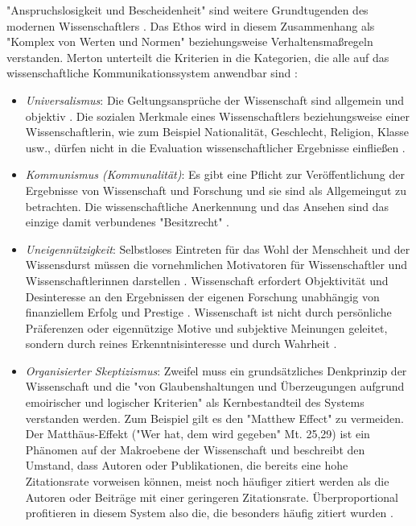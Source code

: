 "Anspruchslosigkeit und Bescheidenheit" sind weitere Grundtugenden des modernen Wissenschaftlers \cite{Hagner_2015}. Das Ethos wird in diesem Zusammenhang als "Komplex von Werten und Normen" \cite{Weingart_1998} beziehungsweise Verhaltensmaßregeln verstanden. Merton unterteilt die Kriterien in die Kategorien, die alle auf das wissenschaftliche Kommunikationssystem anwendbar sind \cite{Merton_1973} \cite{Froehlich_2009}:
\begin{itemize}
\item \textit{Universalismus}: Die Geltungsansprüche der Wissenschaft sind allgemein und objektiv \cite[:67]{Oezmen_2015}. Die sozialen Merkmale eines Wissenschaftlers beziehungsweise einer Wissenschaftlerin, wie zum Beispiel Nationalität, Geschlecht, Religion, Klasse usw., dürfen nicht in die Evaluation wissenschaftlicher Ergebnisse einfließen \cite{Weingart_1998}.
\item \textit{Kommunismus (Kommunalität)}: Es gibt eine Pflicht zur Veröffentlichung der Ergebnisse von Wissenschaft und Forschung und sie sind als Allgemeingut zu betrachten. Die wissenschaftliche Anerkennung und das Ansehen sind das einzige damit verbundenes "Besitzrecht" \cite{Merton_1973}.
\item \textit{Uneigennützigkeit}: Selbstloses Eintreten für das Wohl der Menschheit und der Wissensdurst müssen die vornehmlichen Motivatoren für Wissenschaftler und Wissenschaftlerinnen darstellen \cite{Weingart_1998}. Wissenschaft erfordert Objektivität und Desinteresse an den Ergebnissen der eigenen Forschung \cite{Merton_1973} unabhängig von finanziellem Erfolg und Prestige \cite{Weingart_1998}. Wissenschaft ist nicht durch persönliche Präferenzen oder eigennützige Motive und subjektive Meinungen geleitet, sondern durch reines Erkenntnisinteresse und durch Wahrheit \cite[:67]{Oezmen_2015}.
\item \textit{Organisierter Skeptizismus}: Zweifel muss ein grundsätzliches Denkprinzip der Wissenschaft \cite{Merton_1973} und die "von Glaubenshaltungen und Überzeugungen aufgrund emoirischer und logischer Kriterien" \cite{Weingart_1998} als Kernbestandteil des Systems verstanden werden. Zum Beispiel gilt es den "Matthew Effect" zu vermeiden. Der Matthäus-Effekt ("Wer hat, dem wird gegeben" Mt. 25,29) ist ein Phänomen auf der Makroebene der Wissenschaft \cite{Bonitz_1998} und  beschreibt den Umstand, dass Autoren oder Publikationen, die bereits eine hohe Zitationsrate vorweisen können, meist noch häufiger zitiert werden als die Autoren oder Beiträge mit einer geringeren Zitationsrate. Überproportional profitieren in diesem System also die, die besonders häufig zitiert wurden \cite{Merton_1968} \cite{Meier_2009}.
\end{itemize}

